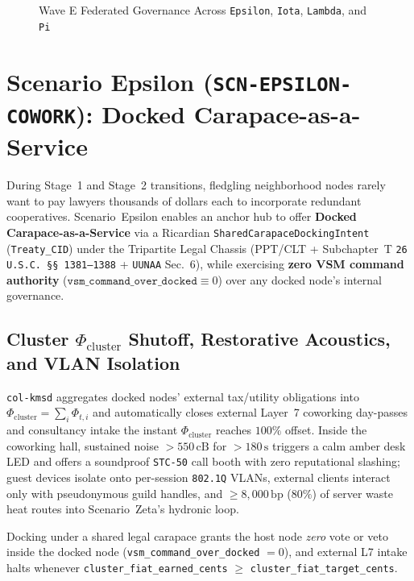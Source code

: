 \begin{figure}[htbp]
{%
}
\caption{Wave E Federated Governance Across \texttt{Epsilon}, \texttt{Iota}, \texttt{Lambda}, and \texttt{Pi}}
\label{fig:wavee-choreography}
\end{figure}

\section{Scenario Epsilon (\texttt{SCN-EPSILON-COWORK}): Docked Carapace-as-a-Service}
\label{sec:wavee-epsilon}

During Stage~1 and Stage~2 transitions, fledgling neighborhood nodes rarely want to pay lawyers
thousands of dollars each to incorporate redundant cooperatives. Scenario~Epsilon enables an anchor
hub to offer \textbf{Docked Carapace-as-a-Service} via a Ricardian \texttt{SharedCarapaceDockingIntent}
(\texttt{Treaty\_CID}) under the Tripartite Legal Chassis (PPT/CLT + Subchapter~T \texttt{26 U.S.C.\ \S\S\,1381--1388}
+ \texttt{UUNAA} Sec.~6), while exercising \textbf{zero VSM command authority}
($\mathtt{vsm\_command\_over\_docked} \equiv 0$) over any docked node's internal governance.

\subsection{Cluster $\Phi_{\mathrm{cluster}}$ Shutoff, Restorative Acoustics, and VLAN Isolation}

\texttt{col-kmsd} aggregates docked nodes' external tax/utility obligations into $\Phi_{\mathrm{cluster}} = \sum_i \Phi_{t,i}$
and automatically closes external Layer~7 coworking day-passes and consultancy intake the instant
$\Phi_{\mathrm{cluster}}$ reaches $100\%$ offset. Inside the coworking hall, sustained noise
$> 550\,\mathrm{cB}$ for $> 180\,\mathrm{s}$ triggers a calm amber desk LED and offers a soundproof
\texttt{STC-50} call booth with zero reputational slashing; guest devices isolate onto per-session
\texttt{802.1Q} VLANs, external clients interact only with pseudonymous guild handles, and
$\ge 8{,}000\,\mathrm{bp}$ ($80\%$) of server waste heat routes into Scenario~Zeta's hydronic loop.

\begin{invariant}
\label{inv:wavee-epsilon-dock}
Docking under a shared legal carapace grants the host node \textit{zero} vote or veto inside the
docked node (\texttt{vsm\_command\_over\_docked} $= 0$), and external L7 intake halts whenever
\texttt{cluster\_fiat\_earned\_cents} $\ge$ \texttt{cluster\_fiat\_target\_cents}.
\end{invariant}

